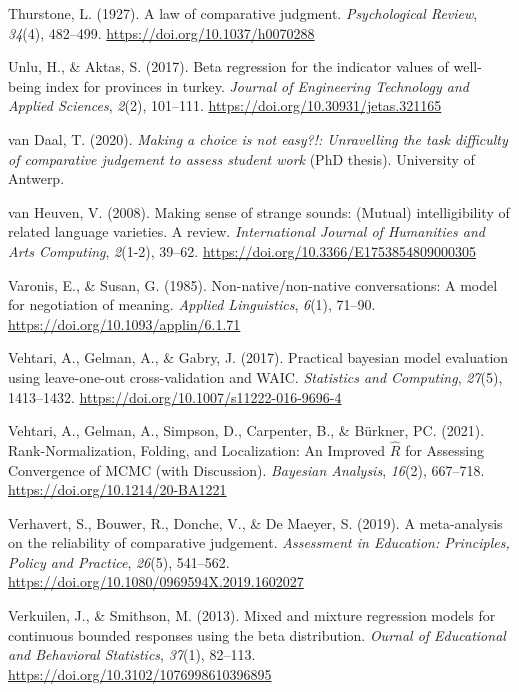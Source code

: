\documentclass[
]{agujournal2019}
\newlength{\cslhangindent}
\newenvironment{CSLReferences}[2] %
 {\begin{list}{}{%
  \setlength{\itemindent}{0pt}
  \setlength{\leftmargin}{0pt}
  \setlength{\parsep}{0pt}
  \ifodd #1
   \setlength{\leftmargin}{\cslhangindent}
   \setlength{\itemindent}{-1\cslhangindent}
  \fi
  \setlength{\itemsep}{#2\baselineskip}}}
 {\end{list}}
\begin{document}
\begin{CSLReferences}{1}{0}
Thurstone, L. (1927). A law of comparative judgment. \emph{Psychological
Review}, \emph{34}(4), 482--499. \url{https://doi.org/10.1037/h0070288}

Unlu, H., \& Aktas, S. (2017). Beta regression for the indicator values
of well-being index for provinces in turkey. \emph{Journal of
Engineering Technology and Applied Sciences}, \emph{2}(2), 101--111.
\url{https://doi.org/10.30931/jetas.321165}

van Daal, T. (2020). \emph{Making a choice is not easy?!: Unravelling
the task difficulty of comparative judgement to assess student work}
(PhD thesis). University of Antwerp.

van Heuven, V. (2008). Making sense of strange sounds: (Mutual)
intelligibility of related language varieties. A review.
\emph{International Journal of Humanities and Arts Computing},
\emph{2}(1-2), 39--62. \url{https://doi.org/10.3366/E1753854809000305}

Varonis, E., \& Susan, G. (1985). Non-native/non-native conversations: A
model for negotiation of meaning. \emph{Applied Linguistics},
\emph{6}(1), 71--90. \url{https://doi.org/10.1093/applin/6.1.71}

Vehtari, A., Gelman, A., \& Gabry, J. (2017). Practical bayesian model
evaluation using leave-one-out cross-validation and WAIC.
\emph{Statistics and Computing}, \emph{27}(5), 1413--1432.
\url{https://doi.org/10.1007/s11222-016-9696-4}

Vehtari, A., Gelman, A., Simpson, D., Carpenter, B., \& Bürkner, PC.
(2021). {Rank-Normalization, Folding, and Localization: An Improved
\(\widehat{R}\) for Assessing Convergence of MCMC (with Discussion)}.
\emph{Bayesian Analysis}, \emph{16}(2), 667--718.
\url{https://doi.org/10.1214/20-BA1221}

Verhavert, S., Bouwer, R., Donche, V., \& De Maeyer, S. (2019). A
meta-analysis on the reliability of comparative judgement.
\emph{Assessment in Education: Principles, Policy and Practice},
\emph{26}(5), 541--562.
\url{https://doi.org/10.1080/0969594X.2019.1602027}

Verkuilen, J., \& Smithson, M. (2013). Mixed and mixture regression
models for continuous bounded responses using the beta distribution.
\emph{Ournal of Educational and Behavioral Statistics}, \emph{37}(1),
82--113. \url{https://doi.org/10.3102/1076998610396895}


\end{CSLReferences}
\end{document}
